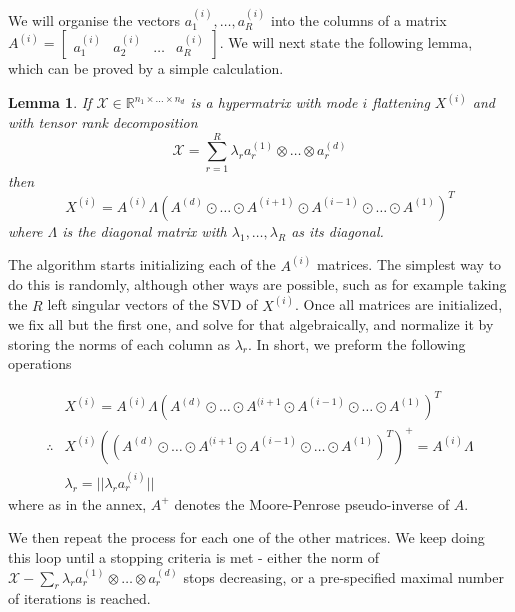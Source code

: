 \documentclass{report}
\newtheorem{lemma}{Lemma}[thrm]
\theoremstyle{definition}
\theoremstyle{remark}
\begin{document}
We will organise the vectors $a_1^{(i)},\dots,a_R^{(i)}$ into the columns of a matrix $A^{(i)} = \begin{bmatrix} a_1^{(i)} & a_2^{(i)} & \dots & a_R^{(i)} \end{bmatrix}$. We will next state the following lemma, which can be proved by a simple calculation. 

\begin{lemma}
    If $\mathcal{X}\in \mathbb{R}^{n_1 \times \dots \times n_d}$ is a hypermatrix with mode $i$ flattening $X^{(i)}$ and with tensor rank decomposition 
    \begin{equation*}
        \mathcal{X} = \sum_{r=1}^R \lambda_r a_r^{(1)} \otimes \dots \otimes a_r^{(d)}
    \end{equation*}
    then 
    \begin{equation*}
        X^{(i)} = A^{(i)}\Lambda (A^{(d)} \odot \dots \odot A^{(i+1)} \odot A^{(i-1)} \odot \dots \odot A^{(1)})^T
    \end{equation*}
    where $\Lambda$ is the diagonal matrix with $\lambda_1,\dots,\lambda_R$ as its diagonal. 
\end{lemma}

The algorithm starts initializing each of the $A^{(i)}$ matrices. The simplest way to do this is randomly, although other ways are possible, such as for example taking the $R$ left singular vectors of the SVD of $X^{(i)}$. Once all matrices are initialized, we fix all but the first one, and solve for that algebraically, and normalize it by storing the norms of each column as $\lambda_r$. In short, we preform the following operations

\begin{equation*}
    \begin{split}
       & X^{(i)} = A^{(i)}\Lambda ( A^{(d)} \odot \dots \odot A^{(i+1} \odot A^{(i-1)} \odot \dots \odot A^{(1)})^T \\
       \therefore & X^{(i)}(( A^{(d)} \odot \dots \odot A^{(i+1} \odot A^{(i-1)} \odot \dots \odot A^{(1)})^T)^+ = A^{(i)}\Lambda  \\
       & \lambda_r = || \lambda_r a^{(i)}_r ||
    \end{split}
\end{equation*}
where as in the annex, $A^+$ denotes the Moore-Penrose pseudo-inverse of $A$.

We then repeat the process for each one of the other matrices. We keep doing this loop until a stopping criteria is met - either the norm of $\mathcal{X} - \sum_r \lambda_r a_r^{(1)} \otimes \dots \otimes a_r^{(d)}$ stops decreasing, or a pre-specified maximal number of iterations is reached. 
\end{document}
